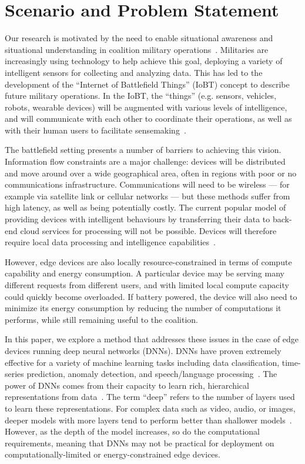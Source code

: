 \section{Scenario and Problem Statement}
\label{sec:scenario}
Our research is motivated by the need to enable situational awareness and situational understanding in coalition military operations~\cite{endsley1995toward, preece2017cognitive}. Militaries are increasingly using technology to help achieve this goal, deploying a variety of intelligent sensors for collecting and analyzing data. This has led to the development of the “Internet of Battlefield Things” (IoBT) concept to describe future military operations. In the IoBT, the “things” (e.g. sensors, vehicles, robots, wearable devices) will be augmented with various levels of intelligence, and will communicate with each other to coordinate their operations, as well as with their human users to facilitate sensemaking~\cite{Kott:2016, Suri:2016}.

The battlefield setting presents a number of barriers to achieving this vision. Information flow constraints are a major challenge: devices will be distributed and move around over a wide geographical area, often in regions with poor or no communications infrastructure. Communications will need to be wireless --- for example via satellite link or cellular networks --- but these methods suffer from high latency, as well as being potentially costly. The current popular model of providing devices with intelligent behaviours by transferring their data to back-end cloud services for processing will not be possible. Devices will therefore require local data processing and intelligence capabilities~\cite{Verma:2017}.

However, edge devices are also locally resource-constrained in terms of compute capability and energy consumption. A particular device may be serving many different requests from different users, and with limited local compute capacity could quickly become overloaded. If battery powered, the device will also need to minimize its energy consumption by reducing the number of computations it performs, while still remaining useful to the coalition.

In this paper, we explore a method that addresses these issues in the case of edge devices running deep neural networks (DNNs). DNNs have proven extremely effective for a variety of machine learning tasks including data classification, time-series prediction, anomaly detection, and speech/language processing~\cite{LeCun:2015, Goodfellow:2016}. The power of DNNs comes from their capacity to learn rich, hierarchical representations from data~\cite{Bengio:2013}. The term ``deep'' refers to the number of layers used to learn these representations. For complex data such as video, audio, or images, deeper models with more layers tend to perform better than shallower models~\cite{Szegedy:2015}. However, as the depth of the model increases, so do the computational requirements, meaning that DNNs may not be practical for deployment on computationally-limited or energy-constrained edge devices.

